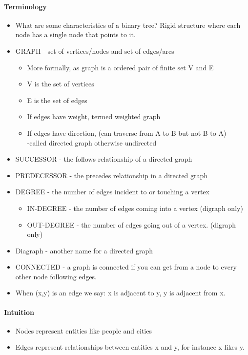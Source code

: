 \documentclass[10pt]{article}
\begin{document}
\paragraph{Terminology}
\begin{itemize}
    \item What are some characteristics of a binary tree? Rigid structure where each node has a single node that points to it.
    \item GRAPH - set of vertices/nodes and set of edges/arcs
          \begin{itemize}
              \item More formally, as graph is a ordered pair of finite set V and E
              \item V is the set of vertices
              \item E is the set of edges
              \item If edges have weight, termed weighted graph
              \item If edges have direction, (can traverse from A to B but not B to A)\\
                    \indent -called directed graph otherwise undirected
          \end{itemize}
    \item SUCCESSOR  - the follows relationship of a directed graph
    \item PREDECESSOR  - the precedes relationship in a directed graph
    \item DEGREE - the number of edges incident to or touching a vertex
          \begin{itemize}
              \item IN-DEGREE - the number of edges coming into a vertex (digraph only)
              \item OUT-DEGREE - the number of edges going out of a vertex. (digraph only)
          \end{itemize}
    \item Diagraph - another name for a directed graph
    \item CONNECTED - a graph is connected if you can get from a node to every other node following edges.
    \item When (x,y) is an edge we say: x is adjacent to y, y is adjacent from x.
\end{itemize}
\paragraph{Intuition}
\begin{itemize}
    \item Nodes represent entities like people and cities
    \item Edges represent relationships between entities x and y, for instance x likes y.
\end{itemize}
\newpage
\end{document}
